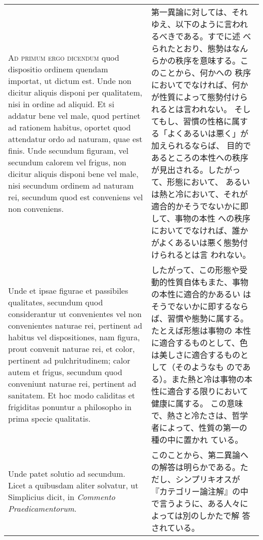 \documentclass[10pt]{jsarticle} %
\begin{document}
\begin{longtable}{p{21em}p{21em}}
\\



{\scshape Ad primum ergo dicendum} quod dispositio ordinem quendam importat, ut
dictum est. Unde non dicitur aliquis disponi per qualitatem, nisi in
ordine ad aliquid. Et si addatur bene vel male, quod pertinet ad
rationem habitus, oportet quod attendatur ordo ad naturam, quae est
finis. Unde secundum figuram, vel secundum calorem vel frigus, non
dicitur aliquis disponi bene vel male, nisi secundum ordinem ad
naturam rei, secundum quod est conveniens vel non conveniens. 


&

第一異論に対しては、それゆえ、以下のように言われるべきである。すでに述
べられたとおり、態勢はなんらかの秩序を意味する。このことから、何かへの
秩序においてでなければ、何かが性質によって態勢付けられるとは言われない。
そしてもし、習慣の性格に属する「よくあるいは悪く」が加えられるならば、
目的であるところの本性への秩序が見出される。したがって、形態において、
あるいは熱と冷において、それが適合的かそうでないかに即して、事物の本性
への秩序においてでなければ、誰かがよくあるいは悪く態勢付けられるとは言
われない。


\\


Unde et
ipsae figurae et passibiles qualitates, secundum quod considerantur ut
convenientes vel non convenientes naturae rei, pertinent ad habitus
vel dispositiones, nam figura, prout convenit naturae rei, et color,
pertinent ad pulchritudinem; calor autem et frigus, secundum quod
conveniunt naturae rei, pertinent ad sanitatem. Et hoc modo caliditas
et frigiditas ponuntur a philosopho in prima specie qualitatis.

&

したがって、この形態や受動的性質自体もまた、事物の本性に適合的かあるい
はそうでないかに即するならば、習慣や態勢に属する。たとえば形態は事物の
本性に適合するものとして、色は美しさに適合するものとして（そのようなも
のである）。また熱と冷は事物の本性に適合する限りにおいて健康に属する。
この意味で、熱さと冷たさは、哲学者によって、性質の第一の種の中に置かれ
ている。

\\



Unde patet solutio ad secundum. Licet a quibusdam aliter solvatur, ut
Simplicius dicit, in {\itshape Commento Praedicamentorum}.

&

このことから、第二異論への解答は明らかである。ただし、シンプリキオスが
『カテゴリー論注解』の中で言うように、ある人々によっては別のしかたで解
答されている。


\end{longtable}
\end{document}
